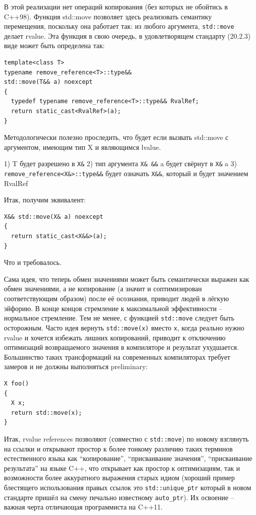 \documentclass[a4paper,12pt,oneside]{article}
\begin{document}
В этой реализации нет операций копирования (без которых не обойтись в C++98). Функция std::move позволяет здесь реализовать семантику перемещения, поскольку она работает так: из любого аргумента, \lstinline!std::move! делает rvalue. Эта функция в свою очередь, в удовлетворящем стандарту (20.2.3) виде может быть определена так:

\begin{lstlisting}
template<class T> 
typename remove_reference<T>::type&&
std::move(T&& a) noexcept
{
  typedef typename remove_reference<T>::type&& RvalRef;
  return static_cast<RvalRef>(a);
} 
\end{lstlisting}

Методологически полезно проследить, что будет если вызвать std::move с аргументом, имеющим тип X и являющимся lvalue.

1) T будет разрешено в \lstinline!X&!
2) тип аргумента \lstinline!X& &&! a будет свёрнут в \lstinline!X&! a
3) \lstinline!remove_reference<X&>::type&&! будет означать \lstinline!X&&!, который и будет значением RvalRef

Итак, получим эквивалент:

\begin{lstlisting}
X&& std::move(X& a) noexcept
{  
  return static_cast<X&&>(a);
}
\end{lstlisting}

Что и требовалось.

Сама идея, что теперь обмен значениями может быть семантически выражен как обмен значениями, а не копирование (а значит и соптимизирован соответствующим образом) после её осознания, приводит людей в лёгкую эйфорию. В конце концов стремление к максимальной эффективности -- нормальное стремление. Тем не менее, с функцией \lstinline!std::move! следует быть осторожным. Часто идея вернуть \lstinline!std::move(x)! вместо \lstinline!x!, когда реально нужно rvalue и хочется избежать лишних копирований, приводит к отключению оптимизаций возвращаемого значения в компиляторе и результат ухудшается. Большинство таких трансформаций на современных компиляторах требует замеров и не должны выполняться preliminary:

\begin{lstlisting}
X foo()
{
  X x;
  return std::move(x);
}
\end{lstlisting}

Итак, rvalue references позволяют (совместно с \lstinline!std::move!) по новому взглянуть на ссылки и открывают простор к более тонкому различию таких терминов естественного языка как ``копирование'', ``присваивание значения'', ``присваивание результата'' на языке C++, что открывает как простор к оптимизациям, так и возможности более аккуратного выражения старых идиом (хороший пример блестящего использования правых ссылок это \lstinline!std::unique_ptr! который в новом стандарте пришёл на смену печально известному \lstinline!auto_ptr!). Их освоение -- важная черта отличающая программиста на C++11.
\end{document}
